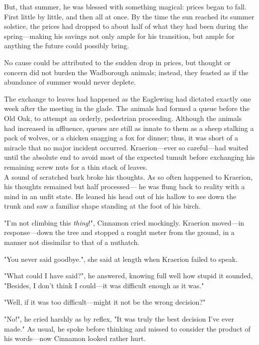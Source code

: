 But, that summer, he was blessed with something magical: prices began to fall. First little by little, and then all at once. By the time the sun reached its summer solstice, the prices had dropped to about half of what they had been during the spring---making his savings not only ample for his transition, but ample for anything the future could possibly bring.

No cause could be attributed to the sudden drop in prices, but thought or concern did not burden the Wadborough animals; instead, they feasted as if the abundance of summer would never deplete.%

The exchange to leaves had happened as the Eaglewing had dictated exactly one week after the meeting in the glade. The animals had formed a queue before the Old Oak, to attempt an orderly, pedestrian proceeding. Although the animals had increased in affluence, queues are still as innate to them as a sheep stalking a pack of wolves, or a chicken snagging a fox for dinner; thus, it was short of a miracle that no major incident occurred. Kraerion---ever so careful---had waited until the absolute end to avoid most of the expected tumult before exchanging his remaining screw nuts for a thin stack of leaves.\\

A sound of scratched bark broke his thoughts. As so often happened to Kraerion, his thoughts remained but half processed--- he was flung back to reality with a mind in an unfit state. He leaned his head out of his hallow to see down the trunk and saw a familiar shape standing at the foot of his birch.

\renewcommand*{\thepage}{\footnotesize \arabic{page}}

"I'm not climbing this \textit{thing}!", Cinnamon cried mockingly. Kraerion moved---in response---down the tree and stopped a rought meter from the ground, in a manner not dissimilar to that of a nuthatch.

"You never said goodbye.", she said at length when Kraerion failed to speak.

"What could I have said?", he answered, knowing full well how stupid it sounded, "Besides, I don't think I could---it was difficult enough as it was."

"Well, if it was too difficult---might it not be the wrong decision?"

"No!", he cried harshly as by reflex, "It was truly the best decision I've ever made."
As usual, he spoke before thinking and missed to consider the product of his words---now Cinnamon looked rather hurt. 

